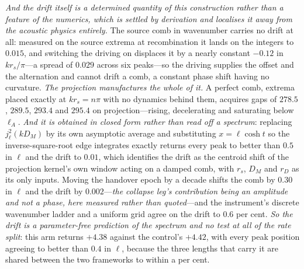 \documentclass[11pt,a4paper]{article}
\theoremstyle{plain}
\theoremstyle{definition}
\theoremstyle{remark}
\begin{document}
\emph{And the drift itself is a determined quantity of this construction rather than a feature of the
numerics, which is settled by derivation and localises it away from the acoustic physics entirely.}
The source comb in wavenumber carries no drift at all: measured on the source extrema at
recombination it lands on the integers to $0.015$, and switching the driving on displaces it by a
nearly constant $-0.12$ in $kr_{s}/\pi$---a spread of $0.029$ across six peaks---so the driving
supplies the offset and the alternation and cannot drift a comb, a constant phase shift having no
curvature. \emph{The projection manufactures the whole of it.} A perfect comb, extrema placed exactly
at $kr_{s}=n\pi$ with no dynamics behind them, acquires gaps of $278.5$, $289.5$, $293.4$ and $295.4$
on projection---rising, decelerating and saturating below $\ell_{A}$. \emph{And it is obtained in
closed form rather than read off a spectrum}: replacing $j_{\ell}^{2}(kD_{M})$ by its own asymptotic
average and substituting $x=\ell\cosh t$ so the inverse-square-root edge integrates exactly returns
every peak to better than $0.5$ in $\ell$ and the drift to $0.01$, which identifies the drift as the
centroid shift of the projection kernel's own window acting on a damped comb, with $r_{s}$, $D_{M}$
and $r_{D}$ as its only inputs. Moving the handover epoch by a decade shifts the comb by $0.30$ in
$\ell$ and the drift by $0.002$---\emph{the collapse leg's contribution being an amplitude and not a
phase, here measured rather than quoted}---and the instrument's discrete wavenumber ladder and a
uniform grid agree on the drift to $0.6$ per cent. \emph{So the drift is a parameter-free prediction
of the spectrum and no test at all of the rate split}: this arm returns $+4.38$ against the control's
$+4.42$, with every peak position agreeing to better than $0.4$ in $\ell$, because the three lengths
that carry it are shared between the two frameworks to within a per
cent.
\end{document}
